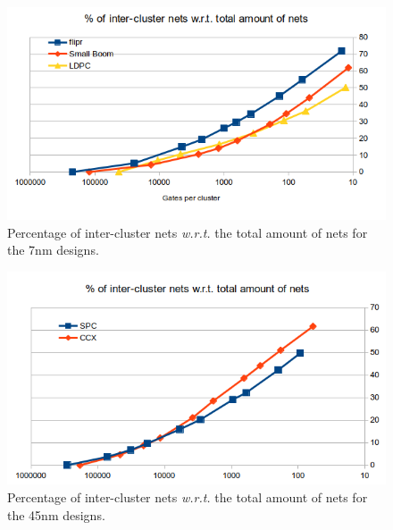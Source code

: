 \documentclass[11pt,a4paper]{report} %
\theoremstyle{customdef}
\begin{document}
\begin{figure}[!h]
	\centering
	\includegraphics[width=.9\textwidth]{img/res-inter-cluster-totalnets-7nm.png}
	\caption{Percentage of inter-cluster nets \textit{w.r.t.} the total amount of nets for the 7nm designs.}
	\label{fig:res-intercl-totnet-7nm}
\end{figure}
\begin{figure}[!h]
	\centering
	\includegraphics[width=.9\textwidth]{img/res-inter-cluster-totalnets-45nm.png}
	\caption{Percentage of inter-cluster nets \textit{w.r.t.} the total amount of nets for the 45nm designs.}
	\label{fig:res-intercl-totnet-45nm}
\end{figure}
\end{document}
